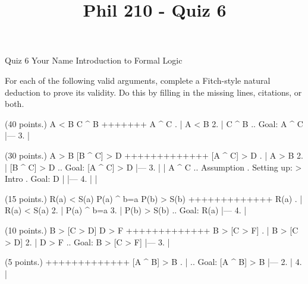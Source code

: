 
\title{Phil 210 - Quiz 6}

\heading
Quiz 6
Your Name
Introduction to Formal Logic
\endheading

For each of the following valid arguments, complete a Fitch-style natural deduction to prove its validity. Do this by filling in the missing lines, citations, or both.

\problems
{} (40 points.)
\argument
 A < B
 C ^ B
+++++++
 A ^ C
\endargument
        \answer
        . | A < B
         2. | C ^ B  ..  Goal: A ^ C
            |---
         3. | 
        \endfitchproof
        \endanswer

 (30 points.)
\argument
 A > B
 [B ^ C] > D
+++++++++++++
 [A ^ C] > D
\endargument
        \answer
        . | A > B
         2. | [B ^ C] > D  ..  Goal: [A ^ C] > D
            |---
         3. |   | A ^ C    ..  Assumption  .  Setting up: > Intro  .  Goal: D
            |   |---
         4. |   | 
        \endfitchproof
        \endanswer

 (15 points.)
\argument
 R(a) < S(a)
 P(a) ^ b=a
 P(b) > S(b)
+++++++++++++
 R(a)
\endargument
        \answer
        . | R(a) < S(a)
         2. | P(a) ^ b=a
         3. | P(b) > S(b)  ..  Goal: R(a)
            |---
         4. | 
        \endfitchproof
        \endanswer

 (10 points.)
\argument
 B > [C > D]
 D > F
+++++++++++++
 B > [C > F]
\endargument
        \answer
        . | B > [C > D]
         2. | D > F        ..  Goal: B > [C > F]
            |---
         3. | 
        \endfitchproof
        \endanswer

 (5 points.)
\argument
+++++++++++++
 [A ^ B] > B
\endargument
        \answer
        . |              ..  Goal: [A ^ B] > B
            |---
         2. | 
         4. |
        \endfitchproof
        \endanswer

\endproblems
\bye
